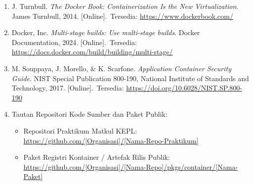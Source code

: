 \begin{enumerate}
    \item \label{bukuTeknik} J. Turnbull. \textit{The Docker Book: Containerization Is the New Virtualization}. James Turnbull, 2014. \mbox{[Online]. Tersedia:} \url{https://www.dockerbook.com/}

    \item \label{dokumentasiResmi} Docker, Inc. \textit{Multi-stage builds: Use multi-stage builds}. Docker Documentation, 2024. \mbox{[Online]. Tersedia:} \url{https://docs.docker.com/build/building/multi-stage/}

    \item \label{standarKeamanan} M. Souppaya, J. Morello, \& K. Scarfone. \textit{Application Container Security Guide}. NIST Special Publication 800-190, National Institute of Standards and Technology, 2017. \mbox{[Online]. Tersedia:} \url{https://doi.org/10.6028/NIST.SP.800-190}

    \item \label{sourcecode} Tautan Repositori Kode Sumber dan Paket Publik:
    \begin{itemize}
        \item Repositori Praktikum Matkul KEPL:\\
        \url{https://github.com/[Organisasi]/[Nama-Repo-Praktikum]}

        \item Paket Registri Kontainer / Artefak Rilis Publik:\\
        \url{https://github.com/[Organisasi]/[Nama-Repo]/pkgs/container/[Nama-Paket]}
    \end{itemize}
\end{enumerate}
